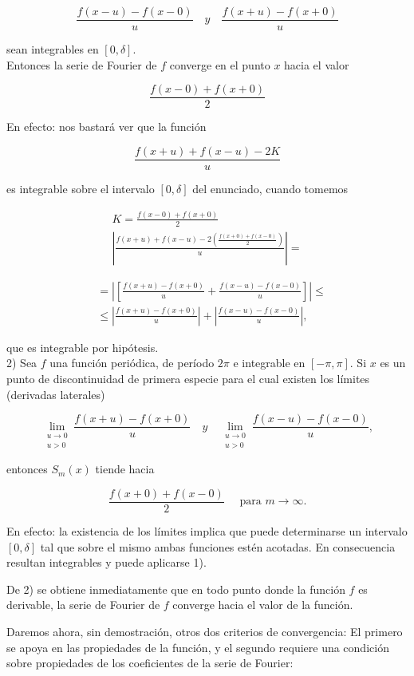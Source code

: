 \documentclass[10pt]{article}
\theoremstyle{plain}
\theoremstyle{definition}
\theoremstyle{remark}
\begin{document}
$$
\frac{f(x-u)-f(x-0)}{u} \quad y \quad \frac{f(x+u)-f(x+0)}{u}
$$

sean integrables en $[0, \delta]$.\\
Entonces la serie de Fourier de $f$ converge en el punto $x$ hacia el valor

$$
\frac{f(x-0)+f(x+0)}{2}
$$

En efecto: nos bastará ver que la función

$$
\frac{f(x+u)+f(x-u)-2 K}{u}
$$

es integrable sobre el intervalo $[0, \delta]$ del enunciado, cuando tomemos

$$
\begin{gathered}
K=\frac{f(x-0)+f(x+0)}{2} \\
\left|\frac{f(x+u)+f(x-u)-2\left(\frac{f(x+0)+f(x-0)}{2}\right)}{u}\right|=
\end{gathered}
$$

$$
\begin{aligned}
& =\left|\left[\frac{f(x+u)-f(x+0)}{u}+\frac{f(x-u)-f(x-0)}{u}\right]\right| \leqslant \\
& \leqslant\left|\frac{f(x+u)-f(x+0)}{u}\right|+\left|\frac{f(x-u)-f(x-0)}{u}\right|,
\end{aligned}
$$

que es integrable por hipótesis.\\
2) Sea $f$ una función periódica, de período $2 \pi$ e integrable en $[-\pi, \pi]$. Si $x$ es un punto de discontinuidad de primera especie para el cual existen los límites (derivadas laterales)

$$
\lim _{\substack{u \rightarrow 0 \\ u>0}} \frac{f(x+u)-f(x+0)}{u} \quad y \quad \lim _{\substack{u \rightarrow 0 \\ u>0}} \frac{f(x-u)-f(x-0)}{u},
$$

entonces $S_{m}(x)$ tiende hacia

$$
\frac{f(x+0)+f(x-0)}{2} \quad \text { para } m \rightarrow \infty .
$$

En efecto: la existencia de los límites implica que puede determinarse un intervalo $[0, \delta]$ tal que sobre el mismo ambas funciones estén acotadas. En consecuencia resultan integrables y puede aplicarse 1).

De 2) se obtiene inmediatamente que en todo punto donde la función $f$ es derivable, la serie de Fourier de $f$ converge hacia el valor de la función.

Daremos ahora, sin demostración, otros dos criterios de convergencia: El primero se apoya en las propiedades de la función, y el segundo requiere una condición sobre propiedades de los coeficientes de la serie de Fourier:
\end{document}
